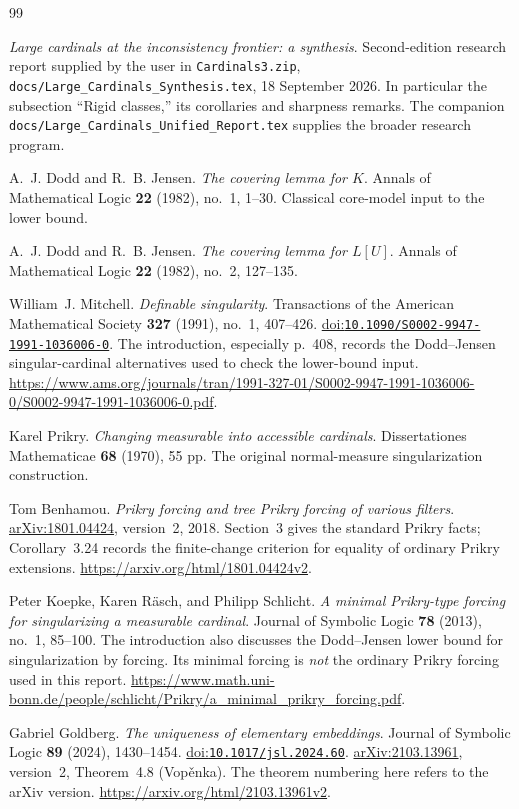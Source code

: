\documentclass[11pt,letterpaper]{article}
\theoremstyle{definition}
\numberwithin{equation}{section}
\newcommand{\arxiv}[1]{\href{https://arxiv.org/abs/#1}{arXiv:#1}}
\newcommand{\doi}[1]{\href{https://doi.org/#1}{doi:\nolinkurl{#1}}}
\begin{document}
\begin{thebibliography}{99}

\emph{Large cardinals at the inconsistency frontier: a synthesis}.
Second-edition research report supplied by the user in
\nolinkurl{Cardinals3.zip},
\nolinkurl{docs/Large_Cardinals_Synthesis.tex}, 18 September 2026.
In particular the subsection ``Rigid classes,'' its corollaries and
sharpness remarks. The companion
\nolinkurl{docs/Large_Cardinals_Unified_Report.tex} supplies the broader
research program.

A.~J. Dodd and R.~B. Jensen.
\emph{The covering lemma for $K$}.
Annals of Mathematical Logic \textbf{22} (1982), no.~1, 1--30.
Classical core-model input to the lower bound.

A.~J. Dodd and R.~B. Jensen.
\emph{The covering lemma for $L[U]$}.
Annals of Mathematical Logic \textbf{22} (1982), no.~2, 127--135.

William~J. Mitchell.
\emph{Definable singularity}.
Transactions of the American Mathematical Society \textbf{327} (1991),
no.~1, 407--426.
\doi{10.1090/S0002-9947-1991-1036006-0}.
The introduction, especially p.~408, records the Dodd--Jensen
singular-cardinal alternatives used to check the lower-bound input.
\url{https://www.ams.org/journals/tran/1991-327-01/S0002-9947-1991-1036006-0/S0002-9947-1991-1036006-0.pdf}.

Karel Prikry.
\emph{Changing measurable into accessible cardinals}.
Dissertationes Mathematicae \textbf{68} (1970), 55 pp.
The original normal-measure singularization construction.

Tom Benhamou.
\emph{Prikry forcing and tree Prikry forcing of various filters}.
\arxiv{1801.04424}, version~2, 2018.
Section~3 gives the standard Prikry facts; Corollary~3.24 records the
finite-change criterion for equality of ordinary Prikry extensions.
\url{https://arxiv.org/html/1801.04424v2}.

Peter Koepke, Karen R\"asch, and Philipp Schlicht.
\emph{A minimal Prikry-type forcing for singularizing a measurable cardinal}.
Journal of Symbolic Logic \textbf{78} (2013), no.~1, 85--100.
The introduction also discusses the Dodd--Jensen lower bound for
singularization by forcing. Its minimal forcing is \emph{not} the
ordinary Prikry forcing used in this report.
\url{https://www.math.uni-bonn.de/people/schlicht/Prikry/a_minimal_prikry_forcing.pdf}.

Gabriel Goldberg.
\emph{The uniqueness of elementary embeddings}.
Journal of Symbolic Logic \textbf{89} (2024), 1430--1454.
\doi{10.1017/jsl.2024.60}.
\arxiv{2103.13961}, version~2, Theorem~4.8 (Vop\v enka).
The theorem numbering here refers to the arXiv version.
\url{https://arxiv.org/html/2103.13961v2}.


\end{thebibliography}
\end{document}

